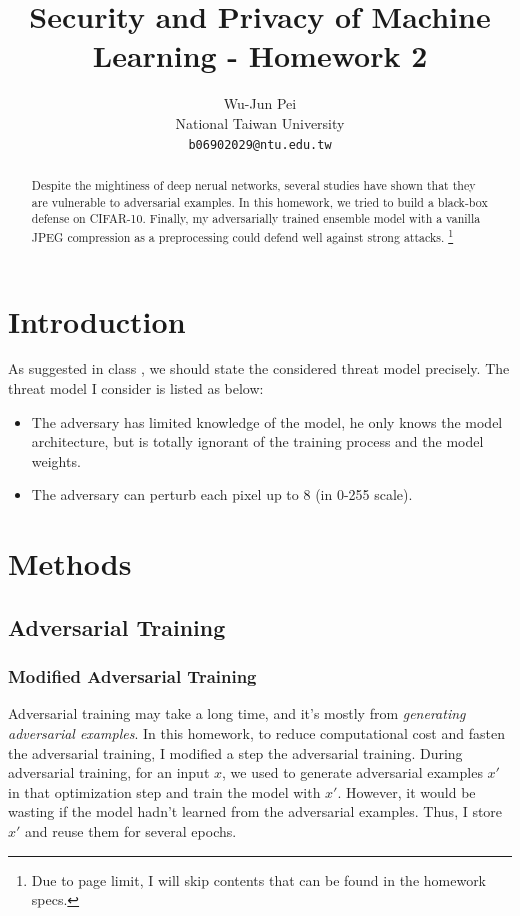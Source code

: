 \documentclass{article}
\title{Security and Privacy of Machine Learning - Homework 2}
\author{
  Wu-Jun Pei\\
  National Taiwan University\\
  \texttt{b06902029@ntu.edu.tw} \\
}
\begin{document}
\maketitle

\begin{abstract}
Despite the mightiness of deep nerual networks, several studies have shown that they are vulnerable
to adversarial examples. In this homework, we tried to build a black-box defense on CIFAR-10.
Finally, my adversarially trained ensemble model with a vanilla JPEG compression as a preprocessing
could defend well against strong attacks.
\footnote{Due to page limit, I will skip contents that can be found in the homework specs.}
\end{abstract}

\section{Introduction}

As suggested in class \cite{spml0925}, we should state the considered threat model
precisely. The threat model I consider is listed as below:

\begin{itemize}
  \item The adversary has limited knowledge of the model, he only knows the model architecture, but
  is totally ignorant of the training process and the model weights.
  \item The adversary can perturb each pixel up to 8 (in 0-255 scale).
\end{itemize}

\section{Methods}
\subsection{Adversarial Training}
\subsubsection{Modified Adversarial Training}
Adversarial training \cite{madry2019deep} may take a long time, and it's mostly from
\textit{generating adversarial examples}. In this homework, to reduce computational cost and fasten
the adversarial training, I modified a step the adversarial training. During adversarial training,
for an input $x$, we used to generate adversarial examples $x'$ in that optimization step and train
the model with $x'$. However, it would be wasting if the model hadn't learned from the adversarial
examples. Thus, I store $x'$ and reuse them for several epochs.
\end{document}
